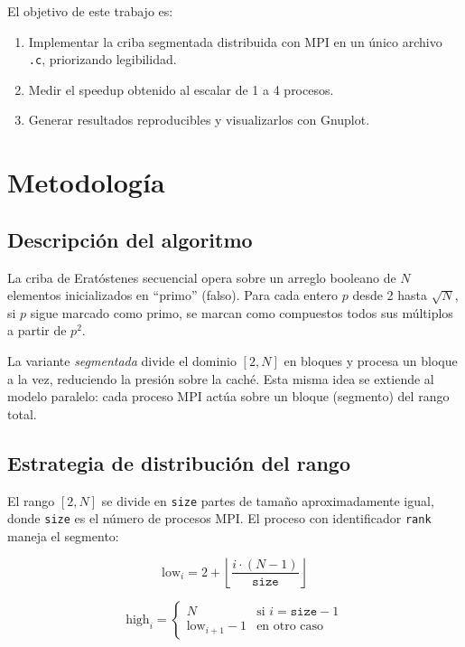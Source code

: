 \documentclass[conference]{IEEEtran}
\begin{document}
El objetivo de este trabajo es:
\begin{enumerate}
  \item Implementar la criba segmentada distribuida con MPI en un único
        archivo \texttt{.c}, priorizando legibilidad.
  \item Medir el speedup obtenido al escalar de 1 a 4 procesos.
  \item Generar resultados reproducibles y visualizarlos con Gnuplot.
\end{enumerate}

\section{Metodología}

\subsection{Descripción del algoritmo}

La criba de Eratóstenes secuencial opera sobre un arreglo booleano de $N$
elementos inicializados en ``primo'' (falso). Para cada entero $p$ desde 2
hasta $\sqrt{N}$, si $p$ sigue marcado como primo, se marcan como compuestos
todos sus múltiplos a partir de $p^2$.

La variante \textit{segmentada} divide el dominio $[2, N]$ en bloques y
procesa un bloque a la vez, reduciendo la presión sobre la caché. Esta misma
idea se extiende al modelo paralelo: cada proceso MPI actúa sobre un bloque
(segmento) del rango total.

\subsection{Estrategia de distribución del rango}

El rango $[2, N]$ se divide en \texttt{size} partes de tamaño aproximadamente
igual, donde \texttt{size} es el número de procesos MPI. El proceso con
identificador \texttt{rank} maneja el segmento:

\begin{equation}
  \text{low}_i  = 2 + \left\lfloor \frac{i \cdot (N-1)}{\texttt{size}} \right\rfloor
  \label{eq:low}
\end{equation}

\begin{equation}
  \text{high}_i =
  \begin{cases}
    N & \text{si } i = \texttt{size} - 1 \\
    \text{low}_{i+1} - 1 & \text{en otro caso}
  \end{cases}
  \label{eq:high}
\end{equation}
\end{document}
